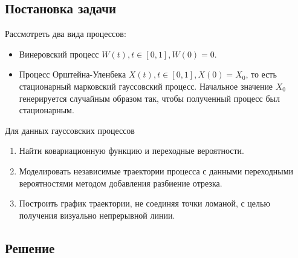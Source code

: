 \documentclass[11pt]{article}
\begin{document}
\subsection{Постановка задачи}
Рассмотреть два вида процессов:
\begin{itemize}
	\item [\textbullet] Винеровский процесс $W(t), t \in [0,1], W(0) = 0.$
	\item [\textbullet] Процесс Орштейна-Уленбека $X(t),t\in [0,1], X(0) = X_0$, то есть стационарный марковский гауссовский процесс. Начальное значение $X_0$ генерируется случайным образом так, чтобы полученный процесс был стационарным.
\end{itemize}
Для данных гауссовских процессов
\begin{enumerate}
	\item Найти ковариационную функцию и переходные вероятности. 
	\item Моделировать независимые траектории процесса с данными переходными вероятностями методом добавления разбиение отрезка.
	\item Построить график траектории, не соединяя точки ломаной, с целью получения визуально непрерывной линии.
\end{enumerate}
\subsection{Решение}
\end{document}
